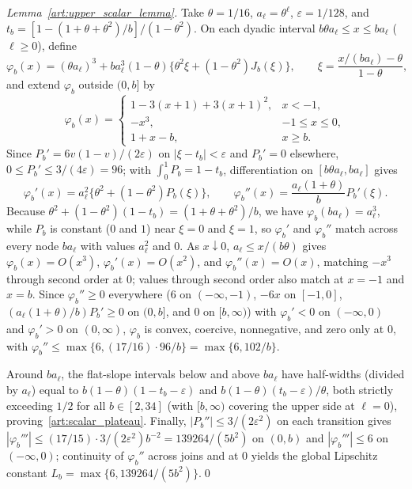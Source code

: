 \begin{proof}[Lemma~\ref{art:upper_scalar_lemma}]
Take $\theta=1/16$, $a_\ell=\theta^\ell$, $\varepsilon=1/128$, and
$t_b=[1-(1+\theta+\theta^2)/b]/(1-\theta^2)$. On each dyadic interval
$b\theta a_\ell\le x\le ba_\ell$ ($\ell\ge0$), define
\begin{equation}\label{art:upper_scalar}
 \varphi_b(x)=(\theta a_\ell)^3+
 ba_\ell^3(1-\theta)\bigl\{\theta^2\xi+(1-\theta^2)J_b(\xi)\bigr\},\qquad
 \xi=\frac{x/(ba_\ell)-\theta}{1-\theta},
\end{equation}
and extend $\varphi_b$ outside $(0,b]$ by
\[
 \varphi_b(x)=
 \begin{cases}
 1-3(x+1)+3(x+1)^2,&x<-1,\\
 -x^3,&-1\le x\le0,\\
 1+x-b,&x\ge b.
 \end{cases}
\]
Since $P_b'=6v(1-v)/(2\varepsilon)$ on $|\xi-t_b|<\varepsilon$ and $P_b'=0$
elsewhere, $0\le P_b'\le3/(4\varepsilon)=96$; with $\int_0^1P_b=1-t_b$,
differentiation on $[b\theta a_\ell,ba_\ell]$ gives
\[
 \varphi_b'(x)=a_\ell^2\bigl\{\theta^2+(1-\theta^2)P_b(\xi)\bigr\},\qquad
 \varphi_b''(x)=\frac{a_\ell(1+\theta)}bP_b'(\xi).
\]
Because $\theta^2+(1-\theta^2)(1-t_b)=(1+\theta+\theta^2)/b$, we have
$\varphi_b(ba_\ell)=a_\ell^3$, while $P_b$ is constant ($0$ and $1$) near
$\xi=0$ and $\xi=1$, so $\varphi_b'$ and $\varphi_b''$ match across every node
$ba_\ell$ with values $a_\ell^2$ and $0$. As $x\downarrow0$, $a_\ell\le x/(b\theta)$
gives $\varphi_b(x)=O(x^3)$, $\varphi_b'(x)=O(x^2)$, and $\varphi_b''(x)=O(x)$,
matching $-x^3$ through second order at $0$; values through second order also
match at $x=-1$ and $x=b$. Since $\varphi_b''\ge0$ everywhere ($6$ on
$(-\infty,-1)$, $-6x$ on $[-1,0]$, $(a_\ell(1+\theta)/b)P_b'\ge0$ on $(0,b]$,
and $0$ on $[b,\infty)$) with $\varphi_b'<0$ on $(-\infty,0)$ and $\varphi_b'>0$
on $(0,\infty)$, $\varphi_b$ is convex, coercive, nonnegative, and zero only at
$0$, with $\varphi_b''\le\max\{6,(17/16)\cdot96/b\}=\max\{6,102/b\}$.

Around $ba_\ell$, the flat-slope intervals below and above $ba_\ell$ have
half-widths (divided by $a_\ell$) equal to $b(1-\theta)(1-t_b-\varepsilon)$ and
$b(1-\theta)(t_b-\varepsilon)/\theta$, both strictly exceeding $1/2$ for all
$b\in[2,34]$ (with $[b,\infty)$ covering the upper side at $\ell=0$),
proving~\eqref{art:scalar_plateau}. Finally, $|P_b''|\le3/(2\varepsilon^2)$ on
each transition gives $|\varphi_b'''|\le(17/15)\cdot3/(2\varepsilon^2)b^{-2}=139264/(5b^2)$
on $(0,b)$ and $|\varphi_b'''|\le6$ on $(-\infty,0)$; continuity of $\varphi_b''$
across joins and at $0$ yields the global Lipschitz constant
$L_b=\max\{6,139264/(5b^2)\}$.\qed
\end{proof}

